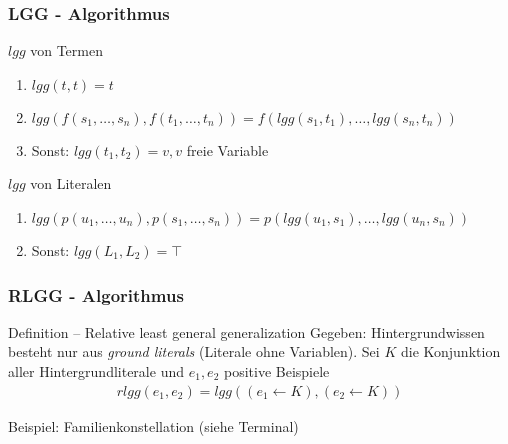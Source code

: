 \begin{frame}
\frametitle{LGG - Algorithmus}
	\begin{block}{$lgg$ von Termen}
		\begin{enumerate}
			\item $lgg(t,t) = t$\\
			\item $lgg(f(s_1, \ldots, s_n), f(t_1, \ldots, t_n)) = f(lgg(s_1, t_1), \ldots, lgg(s_n, t_n))$
			\item Sonst: $lgg(t_1, t_2) = v , v$ freie Variable
		\end{enumerate}
	\end{block}
	\begin{block}{$lgg$ von Literalen}
	\begin{enumerate}
		\item $lgg(p(u_1, \ldots, u_n), p(s_1, \ldots, s_n)) = p(lgg(u_1, s_1), \ldots, lgg(u_n, s_n))$\\
		\item Sonst: $lgg(L_1, L_2) = \top$
	\end{enumerate}
	\end{block}
\end{frame}


\begin{frame}
\frametitle{RLGG - Algorithmus}
\begin{block}{Definition -- Relative least general generalization}
	Gegeben: Hintergrundwissen besteht nur aus \textit{ground literals} (Literale ohne Variablen).
	Sei $K$ die Konjunktion aller Hintergrundliterale und $e_1, e_2$ positive Beispiele
	\begin{align*}
		rlgg(e_1, e_2) = lgg((e_1 \leftarrow K), (e_2 \leftarrow K))
	\end{align*}
\end{block}

Beispiel: Familienkonstellation (siehe Terminal)
\end{frame}


